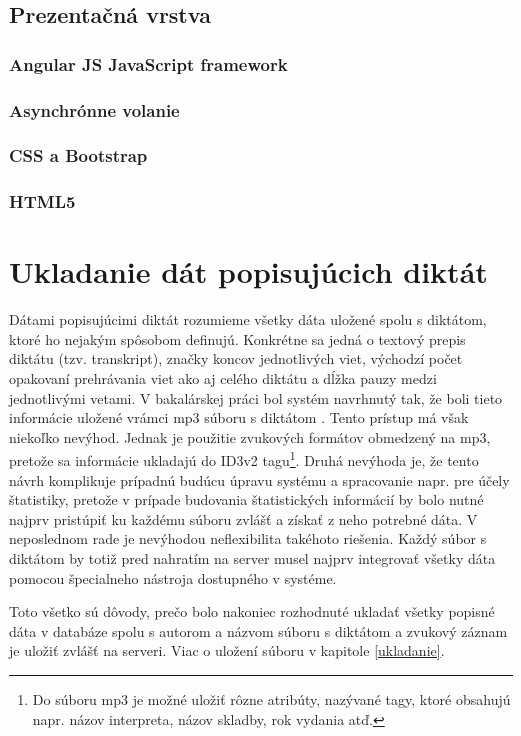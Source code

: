 \documentclass[12pt,oneside]{fithesis2}
\begin{document}
      \subsection{Prezentačná vrstva}
      		\subsubsection{Angular JS JavaScript framework}
			\subsubsection{Asynchrónne volanie}
      		\subsubsection{CSS a Bootstrap}
      		\subsubsection{HTML5}
      		\pagebreak
	\section{Ukladanie dát popisujúcich diktát}
	\par Dátami popisujúcimi diktát rozumieme všetky dáta uložené spolu s diktátom, ktoré ho nejakým spôsobom definujú. Konkrétne sa jedná o textový prepis diktátu (tzv. transkript), značky koncov jednotlivých viet, východzí počet opakovaní prehrávania viet ako aj celého diktátu a dĺžka pauzy medzi jednotlivými vetami. V bakalárskej práci bol systém navrhnutý tak, že boli tieto informácie uložené vrámci mp3 súboru s diktátom \cite{rumanov12}. Tento prístup má však niekoľko nevýhod. Jednak je použitie zvukových formátov obmedzený na mp3, pretože sa informácie ukladajú do ID3v2 tagu\footnote{Do súboru mp3 je možné uložiť rôzne atribúty, nazývané tagy, ktoré obsahujú napr. názov interpreta, názov skladby, rok vydania atď.}. Druhá nevýhoda je, že tento návrh komplikuje prípadnú budúcu úpravu systému a spracovanie napr. pre účely štatistiky, pretože v prípade budovania štatistických informácií by bolo nutné najprv pristúpiť ku každému súboru zvlášť a získať z neho potrebné dáta. V neposlednom rade je nevýhodou neflexibilita takéhoto riešenia. Každý súbor s diktátom by totiž pred nahratím na server musel najprv integrovať všetky dáta pomocou špecialneho nástroja dostupného v systéme.
	\par Toto všetko sú dôvody, prečo bolo nakoniec rozhodnuté ukladať všetky popisné dáta v databáze spolu s autorom a názvom súboru s diktátom a zvukový záznam je uložiť zvlášť na serveri. Viac o uložení súboru v kapitole \ref{ukladanie}.
	        
\end{document}
